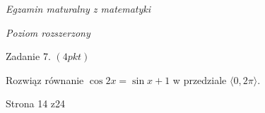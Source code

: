 \documentclass[a4paper,12pt]{article}
\begin{document}
{\it Egzamin maturalny z matematyki}

{\it Poziom rozszerzony}

Zadanie 7. $(4pkt)$

Rozwiąz równanie $\cos 2x=\sin x+1$ w przedziale $\langle 0,2\pi\rangle.$

Strona 14 z24
\end{document}
